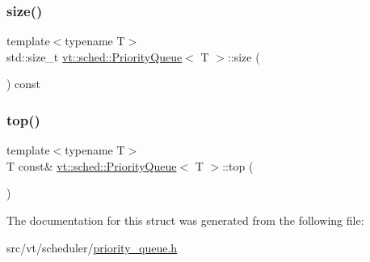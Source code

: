 \mbox{\label{structvt_1_1sched_1_1_priority_queue_a017313382884e652da648d274a09b80d}} 
\subsubsection{\texorpdfstring{size()}{size()}}
{\footnotesize\ttfamily template$<$typename T$>$ \\
std\+::size\+\_\+t \hyperlink{structvt_1_1sched_1_1_priority_queue}{vt\+::sched\+::\+Priority\+Queue}$<$ T $>$\+::size (\begin{DoxyParamCaption}{ }\end{DoxyParamCaption}) const\hspace{0.3cm}{\ttfamily [inline]}}

\mbox{\label{structvt_1_1sched_1_1_priority_queue_ad5f072e3452ba8b950456bc4b072deb1}} 
\subsubsection{\texorpdfstring{top()}{top()}}
{\footnotesize\ttfamily template$<$typename T$>$ \\
T const\& \hyperlink{structvt_1_1sched_1_1_priority_queue}{vt\+::sched\+::\+Priority\+Queue}$<$ T $>$\+::top (\begin{DoxyParamCaption}{ }\end{DoxyParamCaption})\hspace{0.3cm}{\ttfamily [inline]}}



The documentation for this struct was generated from the following file\+:\begin{DoxyCompactItemize}
\item 
src/vt/scheduler/\hyperlink{priority__queue_8h}{priority\+\_\+queue.\+h}\end{DoxyCompactItemize}
